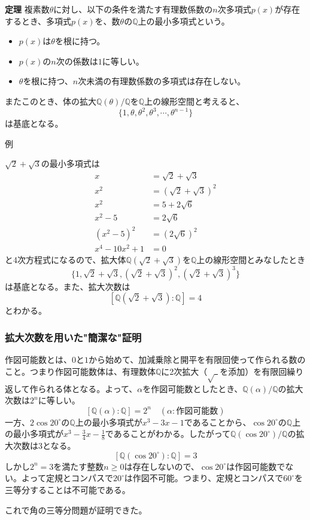 \begin{itembox}[l]{\bf 定理}
複素数$\theta$に対し、以下の条件を満たす有理数係数の$n$次多項式$p(x)$が存在するとき、多項式$p(x)$を、数$\theta$の$\mathbb{Q}$上の最小多項式という。
\begin{itemize}
\item $p(x)$は$\theta$を根に持つ。
\item $p(x)$の$n$次の係数は$1$に等しい。
\item $\theta$を根に持つ、$n$次未満の有理数係数の多項式は存在しない。
\end{itemize}
またこのとき、体の拡大$\mathbb{Q}(\theta)/\mathbb{Q}$を$\mathbb{Q}$上の線形空間と考えると、
$$ \{ 1, \theta, \theta^2, \theta^3, \cdots, \theta^{n-1} \} $$
は基底となる。
\end{itembox}
\newpage
{\gt 例}\par
$\sqrt{2} + \sqrt{3}$の最小多項式は
\begin{align*}
  x &= \sqrt{2} + \sqrt{3}\\
  x^2 &= (\sqrt{2} + \sqrt{3})^2\\
  x^2 &= 5 + 2\sqrt{6}\\
  x^2 - 5 &= 2\sqrt{6}\\
  (x^2 - 5)^2 &= (2\sqrt{6})^2\\
  x^4 - 10x^2 + 1 &= 0
\end{align*}
と4次方程式になるので、拡大体$\mathbb{Q}(\sqrt{2} + \sqrt{3})$を$\mathbb{Q}$上の線形空間とみなしたとき
$$ \{ 1, \sqrt{2} + \sqrt{3}, (\sqrt{2} + \sqrt{3})^2, (\sqrt{2} + \sqrt{3})^3 \} $$
は基底となる。また、拡大次数は
$$[\mathbb{Q}(\sqrt{2} + \sqrt{3}):\mathbb{Q}] = 4$$
とわかる。

\subsubsection{拡大次数を用いた"簡潔な"証明}
作図可能数とは、$0$と$1$から始めて、加減乗除と開平を有限回使って作られる数のこと。つまり作図可能数体は、有理数体$\mathbb{Q}$に2次拡大（$\sqrt{~~}$を添加）を有限回繰り返して作られる体となる。よって、$\alpha$を作図可能数としたとき、$\mathbb{Q}(\alpha)/\mathbb{Q}$の拡大次数は$2^n$に等しい。
$$ [\mathbb{Q}(\alpha):\mathbb{Q}] = 2^n \quad(\alpha:作図可能数) $$
一方、$2\cos 20^\circ$の$\mathbb{Q}$上の最小多項式が$x^3 - 3x - 1$であることから、$\cos 20^\circ$の$\mathbb{Q}$上の最小多項式が$x^3 - \frac{3}{4}x - \frac{1}{8}$であることがわかる。したがって$\mathbb{Q}(\cos 20^\circ)/\mathbb{Q}$の拡大次数は3となる。
$$ [\mathbb{Q}(\cos 20^\circ):\mathbb{Q}] = 3 $$
しかし$2^n = 3$を満たす整数$n \ge 0$は存在しないので、$\cos 20^\circ$は作図可能数でない。よって定規とコンパスで$20^\circ$は作図不可能。つまり、定規とコンパスで$60^\circ$を三等分することは不可能である。\par
これで角の三等分問題が証明できた。

